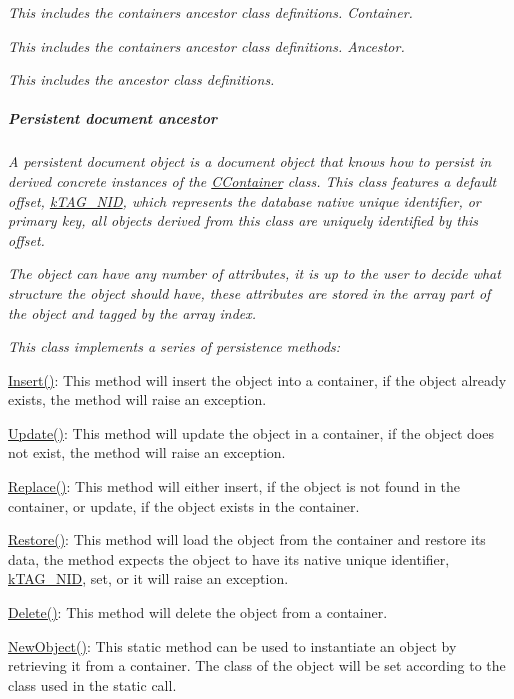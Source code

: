 {\itshape This includes the containers ancestor class definitions. Container.}

{\itshape This includes the containers ancestor class definitions. Ancestor.}

{\itshape This includes the ancestor class definitions. \subparagraph*{Persistent document ancestor}}

{\itshape }

{\itshape A persistent document object is a document object that knows how to persist in derived concrete instances of the \hyperlink{class_c_container}{C\-Container} class. This class features a default offset, \hyperlink{}{k\-T\-A\-G\-\_\-\-N\-I\-D}, which represents the database native unique identifier, or primary key, all objects derived from this class are uniquely identified by this offset.}

{\itshape The object can have any number of attributes, it is up to the user to decide what structure the object should have, these attributes are stored in the array part of the object and tagged by the array index.}

{\itshape This class implements a series of persistence methods\-:}

{\itshape 
\begin{DoxyItemize}
\item \hyperlink{}{Insert()}\-: This method will insert the object into a container, if the object already exists, the method will raise an exception. 
\item \hyperlink{}{Update()}\-: This method will update the object in a container, if the object does not exist, the method will raise an exception. 
\item \hyperlink{}{Replace()}\-: This method will either insert, if the object is not found in the container, or update, if the object exists in the container. 
\item \hyperlink{}{Restore()}\-: This method will load the object from the container and restore its data, the method expects the object to have its native unique identifier, \hyperlink{}{k\-T\-A\-G\-\_\-\-N\-I\-D}, set, or it will raise an exception. 
\item \hyperlink{}{Delete()}\-: This method will delete the object from a container. 
\item \hyperlink{}{New\-Object()}\-: This static method can be used to instantiate an object by retrieving it from a container. The class of the object will be set according to the class used in the static call. 
\end{DoxyItemize}}

